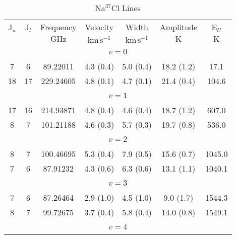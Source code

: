 \begin{table*}[htp]
\centering
\caption{Na$^{37}$Cl Lines}
\begin{tabular}{ccccccc}
\label{tab:Na37Cl_salt_lines}
 J$_u$ & J$_l$ & Frequency & Velocity & Width & Amplitude & E$_U$ \\
  &  & $\mathrm{GHz}$ & $\mathrm{km\,s^{-1}}$ & $\mathrm{km\,s^{-1}}$ & $\mathrm{K}$ & $\mathrm{K}$ \\
\hline
&\vspace{-0.75em}\\
\multicolumn{7}{c}{$v = 0$} \\
\vspace{-0.75em}\\
 7 & 6 & 89.22011 & 4.3 (0.4) & 5.0 (0.4) & 18.2 (1.2) & 17.1 \\
 18 & 17 & 229.24605 & 4.8 (0.1) & 4.7 (0.1) & 21.4 (0.4) & 104.6 \\
&\vspace{-0.75em}\\
\multicolumn{7}{c}{$v = 1$} \\
\vspace{-0.75em}\\
 17 & 16 & 214.93871 & 4.8 (0.4) & 4.6 (0.4) & 18.7 (1.2) & 607.0 \\
 8 & 7 & 101.21188 & 4.6 (0.3) & 5.7 (0.3) & 19.7 (0.8) & 536.0 \\
&\vspace{-0.75em}\\
\multicolumn{7}{c}{$v = 2$} \\
\vspace{-0.75em}\\
 8 & 7 & 100.46695 & 5.3 (0.4) & 7.9 (0.5) & 15.6 (0.7) & 1045.0 \\
 7 & 6 & 87.91232 & 4.3 (0.6) & 6.3 (0.6) & 13.1 (1.1) & 1040.1 \\
&\vspace{-0.75em}\\
\multicolumn{7}{c}{$v = 3$} \\
\vspace{-0.75em}\\
 7 & 6 & 87.26464 & 2.9 (1.0) & 4.5 (1.0) & 9.0 (1.7) & 1544.3 \\
 8 & 7 & 99.72675 & 3.7 (0.4) & 5.8 (0.4) & 14.0 (0.8) & 1549.1 \\
&\vspace{-0.75em}\\
\multicolumn{7}{c}{$v = 4$} \\
\vspace{-0.75em}\\

\end{tabular}
\end{table*}
